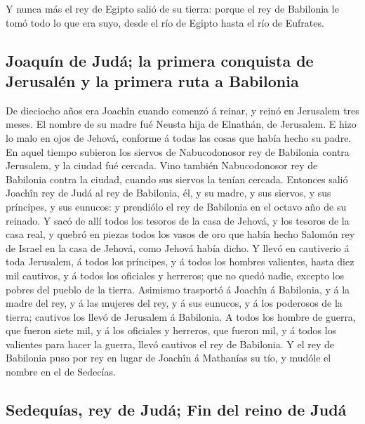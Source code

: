  Y nunca más el rey de Egipto salió de su tierra: porque
el rey de Babilonia le tomó todo lo que era suyo, desde el río de Egipto
hasta el río de Eufrates.

\hypertarget{joaquuxedn-de-juduxe1-la-primera-conquista-de-jerusaluxe9n-y-la-primera-ruta-a-babilonia}{%
\subsection{Joaquín de Judá; la primera conquista de Jerusalén y la
primera ruta a
Babilonia}\label{joaquuxedn-de-juduxe1-la-primera-conquista-de-jerusaluxe9n-y-la-primera-ruta-a-babilonia}}

 De dieciocho años era Joachîn cuando comenzó á reinar, y
reinó en Jerusalem tres meses. El nombre de su madre fué Neusta hija de
Elnathán, de Jerusalem.  E hizo lo malo en ojos de Jehová,
conforme á todas las cosas que había hecho su padre.  En
aquel tiempo subieron los siervos de Nabucodonosor rey de Babilonia
contra Jerusalem, y la ciudad fué cercada.  Vino también
Nabucodonosor rey de Babilonia contra la ciudad, cuando sus siervos la
tenían cercada.  Entonces salió Joachîn rey de Judá al
rey de Babilonia, él, y su madre, y sus siervos, y sus príncipes, y sus
eunucos: y prendiólo el rey de Babilonia en el octavo año de su reinado.
 Y sacó de allí todos los tesoros de la casa de Jehová, y
los tesoros de la casa real, y quebró en piezas todos los vasos de oro
que había hecho Salomón rey de Israel en la casa de Jehová, como Jehová
había dicho.  Y llevó en cautiverio á toda Jerusalem, á
todos los príncipes, y á todos los hombres valientes, hasta diez mil
cautivos, y á todos los oficiales y herreros; que no quedó nadie,
excepto los pobres del pueblo de la tierra.  Asimismo
trasportó á Joachîn á Babilonia, y á la madre del rey, y á las mujeres
del rey, y á sus eunucos, y á los poderosos de la tierra; cautivos los
llevó de Jerusalem á Babilonia.  A todos los hombre de
guerra, que fueron siete mil, y á los oficiales y herreros, que fueron
mil, y á todos los valientes para hacer la guerra, llevó cautivos el rey
de Babilonia.  Y el rey de Babilonia puso por rey en
lugar de Joachîn á Mathanías su tío, y mudóle el nombre en el de
Sedecías.

\hypertarget{sedequuxedas-rey-de-juduxe1-fin-del-reino-de-juduxe1}{%
\subsection{Sedequías, rey de Judá; Fin del reino de
Judá}\label{sedequuxedas-rey-de-juduxe1-fin-del-reino-de-juduxe1}}

